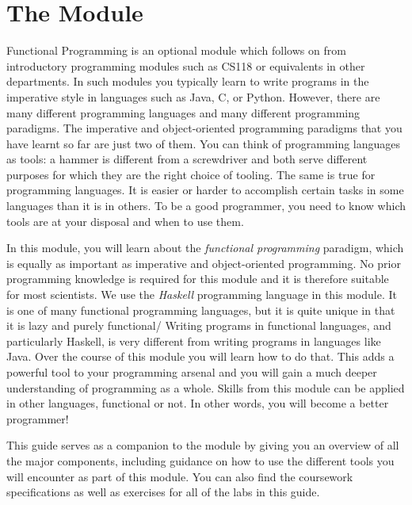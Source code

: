 
\chapter{The Module}

Functional Programming is an optional module which follows on from introductory programming modules such as CS118 or equivalents in other departments. In such modules you typically learn to write programs in the imperative style in languages such as Java, C, or Python. However, there are many different programming languages and many different programming paradigms. The imperative and object-oriented programming paradigms that you have learnt so far are just two of them. You can think of programming languages as tools: a hammer is different from a screwdriver and both serve different purposes for which they are the right choice of tooling. The same is true for programming languages. It is easier or harder to accomplish certain tasks in some languages than it is in others. To be a good programmer, you need to know which tools are at your disposal and when to use them.

In this module, you will learn about the \emph{functional programming} paradigm, which is equally as important as imperative and object-oriented programming. No prior programming knowledge is required for this module and it is therefore suitable for most scientists. We use the \emph{Haskell} programming language in this module. It is one of many functional programming languages, but it is quite unique in that it is lazy and purely functional/ Writing programs in functional languages, and particularly Haskell, is very different from writing programs in languages like Java. Over the course of this module you will learn how to do that. This adds a powerful tool to your programming arsenal and you will gain a much deeper understanding of programming as a whole. Skills from this module can be applied in other languages, functional or not. In other words, you will become a better programmer!

This guide serves as a companion to the module by giving you an overview of all the major components, including guidance on how to use the different tools you will encounter as part of this module. You can also find the coursework specifications as well as exercises for all of the labs in this guide.
